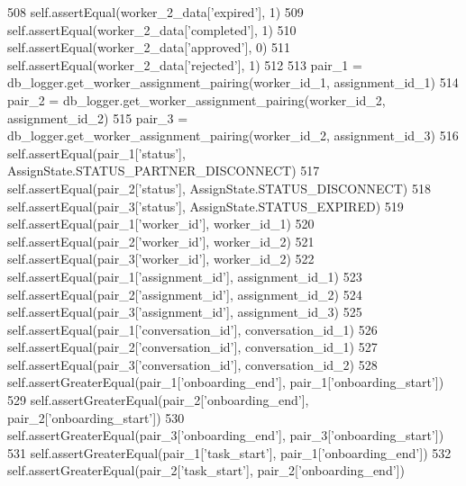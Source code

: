 \begin{DoxyCode}
508         self.assertEqual(worker\_2\_data[\textcolor{stringliteral}{'expired'}], 1)
509         self.assertEqual(worker\_2\_data[\textcolor{stringliteral}{'completed'}], 1)
510         self.assertEqual(worker\_2\_data[\textcolor{stringliteral}{'approved'}], 0)
511         self.assertEqual(worker\_2\_data[\textcolor{stringliteral}{'rejected'}], 1)
512 
513         pair\_1 = db\_logger.get\_worker\_assignment\_pairing(worker\_id\_1, assignment\_id\_1)
514         pair\_2 = db\_logger.get\_worker\_assignment\_pairing(worker\_id\_2, assignment\_id\_2)
515         pair\_3 = db\_logger.get\_worker\_assignment\_pairing(worker\_id\_2, assignment\_id\_3)
516         self.assertEqual(pair\_1[\textcolor{stringliteral}{'status'}], AssignState.STATUS\_PARTNER\_DISCONNECT)
517         self.assertEqual(pair\_2[\textcolor{stringliteral}{'status'}], AssignState.STATUS\_DISCONNECT)
518         self.assertEqual(pair\_3[\textcolor{stringliteral}{'status'}], AssignState.STATUS\_EXPIRED)
519         self.assertEqual(pair\_1[\textcolor{stringliteral}{'worker\_id'}], worker\_id\_1)
520         self.assertEqual(pair\_2[\textcolor{stringliteral}{'worker\_id'}], worker\_id\_2)
521         self.assertEqual(pair\_3[\textcolor{stringliteral}{'worker\_id'}], worker\_id\_2)
522         self.assertEqual(pair\_1[\textcolor{stringliteral}{'assignment\_id'}], assignment\_id\_1)
523         self.assertEqual(pair\_2[\textcolor{stringliteral}{'assignment\_id'}], assignment\_id\_2)
524         self.assertEqual(pair\_3[\textcolor{stringliteral}{'assignment\_id'}], assignment\_id\_3)
525         self.assertEqual(pair\_1[\textcolor{stringliteral}{'conversation\_id'}], conversation\_id\_1)
526         self.assertEqual(pair\_2[\textcolor{stringliteral}{'conversation\_id'}], conversation\_id\_1)
527         self.assertEqual(pair\_3[\textcolor{stringliteral}{'conversation\_id'}], conversation\_id\_2)
528         self.assertGreaterEqual(pair\_1[\textcolor{stringliteral}{'onboarding\_end'}], pair\_1[\textcolor{stringliteral}{'onboarding\_start'}])
529         self.assertGreaterEqual(pair\_2[\textcolor{stringliteral}{'onboarding\_end'}], pair\_2[\textcolor{stringliteral}{'onboarding\_start'}])
530         self.assertGreaterEqual(pair\_3[\textcolor{stringliteral}{'onboarding\_end'}], pair\_3[\textcolor{stringliteral}{'onboarding\_start'}])
531         self.assertGreaterEqual(pair\_1[\textcolor{stringliteral}{'task\_start'}], pair\_1[\textcolor{stringliteral}{'onboarding\_end'}])
532         self.assertGreaterEqual(pair\_2[\textcolor{stringliteral}{'task\_start'}], pair\_2[\textcolor{stringliteral}{'onboarding\_end'}])

\end{DoxyCode}
